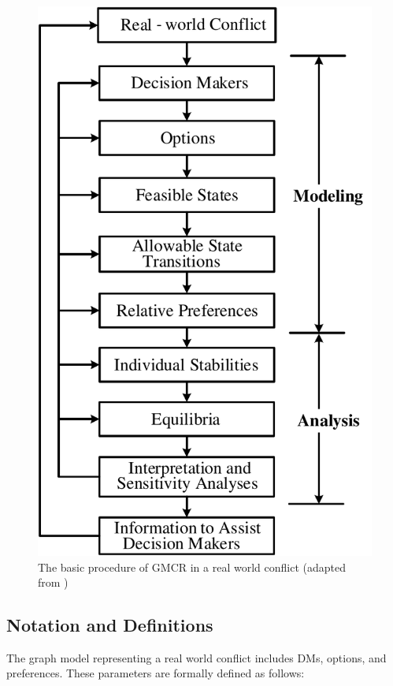 \documentclass[letterpaper,12pt,titlepage,oneside,final]{book}
\begin{document}
\begin{center}
\begin{figure}[h!]
\centering
\includegraphics[scale=0.65]{PDF-IMG/GMCR_pro.pdf}

\caption{The basic procedure of GMCR in a real world conflict (adapted from \citet{fang1993})}

\label{fig:procedure_or}
\end{figure}
\end{center}

\subsection{Notation and Definitions}
The graph model representing a real world conflict includes DMs, options, and preferences. These parameters are formally defined as follows:
\end{document}
